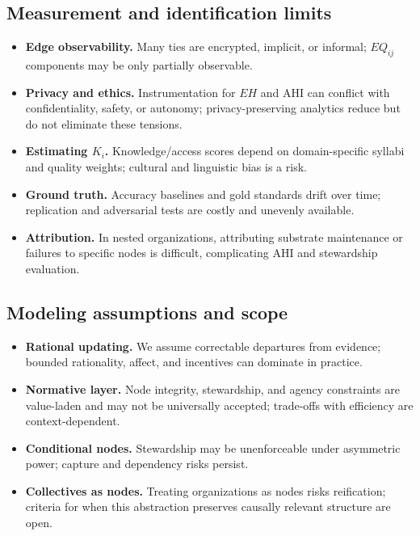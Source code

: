 \documentclass[12pt]{article}
\begin{document}
\subsection{Measurement and identification limits}
\begin{itemize}[leftmargin=1.2em]
\item \textbf{Edge observability.} Many ties are encrypted, implicit, or informal; $EQ_{ij}$ components may be only partially observable.
\item \textbf{Privacy and ethics.} Instrumentation for $EH$ and AHI can conflict with confidentiality, safety, or autonomy; privacy-preserving analytics reduce but do not eliminate these tensions.
\item \textbf{Estimating $K_i$.} Knowledge/access scores depend on domain-specific syllabi and quality weights; cultural and linguistic bias is a risk.
\item \textbf{Ground truth.} Accuracy baselines and gold standards drift over time; replication and adversarial tests are costly and unevenly available.
\item \textbf{Attribution.} In nested organizations, attributing substrate maintenance or failures to specific nodes is difficult, complicating AHI and stewardship evaluation.
\end{itemize}

\subsection{Modeling assumptions and scope}
\begin{itemize}[leftmargin=1.2em]
\item \textbf{Rational updating.} We assume correctable departures from evidence; bounded rationality, affect, and incentives can dominate in practice.
\item \textbf{Normative layer.} Node integrity, stewardship, and agency constraints are value-laden and may not be universally accepted; trade-offs with efficiency are context-dependent.
\item \textbf{Conditional nodes.} Stewardship may be unenforceable under asymmetric power; capture and dependency risks persist.
\item \textbf{Collectives as nodes.} Treating organizations as nodes risks reification; criteria for when this abstraction preserves causally relevant structure are open.
\end{itemize}
\end{document}
